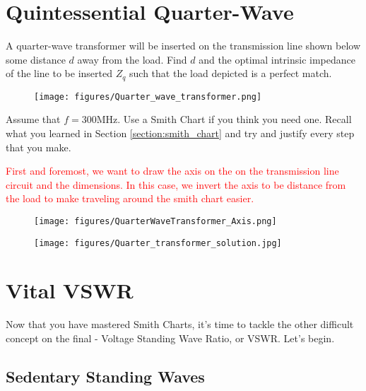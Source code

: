 \documentclass{article}
\begin{document}
\section{Quintessential Quarter-Wave}

A quarter-wave transformer will be inserted on the transmission line shown below some distance $d$ away from the load. Find $d$ and the optimal intrinsic impedance of the line to be inserted $Z_q$ such that the load depicted is a perfect match.

\begin{figure}[h]
\begin{center}
    \texttt{[image: figures/Quarter\_wave\_transformer.png]}
\end{center}
\end{figure}

Assume that $f = 300$MHz. Use a Smith Chart if you think you need one. Recall what you learned in Section \ref{section:smith_chart} and try and justify every step that you make.


\textcolor{red}{First and foremost, we want to draw the axis on the on the transmission line circuit and the dimensions. In this case, we invert the axis to be distance from the load to make traveling around the smith chart easier.}

\begin{figure}
\begin{center}
    \centering
    \texttt{[image: figures/QuarterWaveTransformer\_Axis.png]}
\end{center}
\end{figure}

\begin{figure}[H]
\begin{center}
    \texttt{[image: figures/Quarter\_transformer\_solution.jpg]}
\end{center}
\end{figure}

\newpage

\section{Vital VSWR}

Now that you have mastered Smith Charts, it's time to tackle the other difficult concept on the final - Voltage Standing Wave Ratio, or VSWR. Let's begin.

\subsection{Sedentary Standing Waves}
\end{document}
